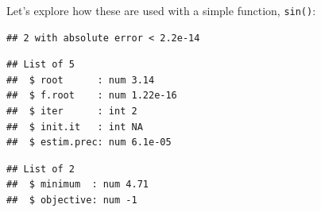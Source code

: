 Let's explore how these are used with a simple function, \texttt{sin()}:

\begin{Shaded}
\begin{Highlighting}[]
\end{Highlighting}
\end{Shaded}

\begin{verbatim}
## 2 with absolute error < 2.2e-14
\end{verbatim}

\begin{Shaded}
\begin{Highlighting}[]
\NormalTok{(}\OperatorTok{*}\StringTok{ }\NormalTok{(} \OperatorTok{/}\StringTok{ }\NormalTok{, } \OperatorTok{/}\StringTok{ }\NormalTok{)))}
\end{Highlighting}
\end{Shaded}

\begin{verbatim}
## List of 5
##  $ root      : num 3.14
##  $ f.root    : num 1.22e-16
##  $ iter      : int 2
##  $ init.it   : int NA
##  $ estim.prec: num 6.1e-05
\end{verbatim}

\begin{Shaded}
\begin{Highlighting}[]
\NormalTok{(}\NormalTok{(}\NormalTok{, } \OperatorTok{*}\StringTok{ }
\end{Highlighting}
\end{Shaded}

\begin{verbatim}
## List of 2
##  $ minimum  : num 4.71
##  $ objective: num -1
\end{verbatim}

\begin{Shaded}
\begin{Highlighting}[]
\NormalTok{(}\NormalTok{(} \NormalTok{))}
\end{Highlighting}
\end{Shaded}

